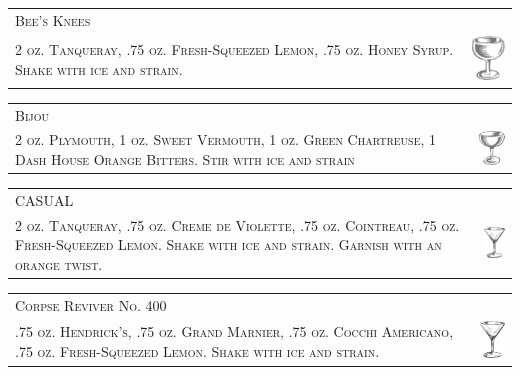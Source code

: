 \documentclass{article}
\begin{document}
\begin{tabular}{b{2.5in} m{0.625in}}
  \multicolumn{2}{p{3.0in}}{\centering\Huge\textsc{Bee's Knees}} \\ 
  \textsc{2 oz. Tanqueray, .75 oz. Fresh-Squeezed Lemon,
  .75 oz. Honey Syrup. Shake with ice and strain.} &
  \includegraphics[width=0.5in]{coupe.png}
\end{tabular}

\begin{tabular}{b{2.5in} m{0.625in}}
  \multicolumn{2}{p{3.0in}}{\centering\Huge\textsc{Bijou}} \\ 
  \textsc{2 oz. Plymouth, 1 oz. Sweet Vermouth, 1 oz. Green Chartreuse, 
  1 Dash House Orange Bitters. Stir with ice and strain} &
  \includegraphics[width=0.5in]{egg_coupe.png}
\end{tabular}

\begin{tabular}{b{2.5in} m{0.625in}}
  \multicolumn{2}{p{3.0in}}{\centering\Huge\textsc{CASUAL}} \\ 
  \textsc{2 oz. Tanqueray, .75 oz. Creme de Violette, .75 oz. Cointreau,
  .75 oz. Fresh-Squeezed Lemon. Shake with ice and strain.
  Garnish with an orange twist.} &
  \includegraphics[width=0.5in]{goblet.png}
\end{tabular}

\begin{tabular}{b{2.5in} m{0.625in}}
  \multicolumn{2}{p{3.0in}}{\centering\Huge\textsc{Corpse Reviver No. 400}} \\ 
  \textsc{.75 oz. Hendrick's, .75 oz. Grand Marnier, .75 oz. Cocchi Americano,
  .75 oz. Fresh-Squeezed Lemon. Shake with ice and strain.} &
  \includegraphics[width=0.5in]{goblet.png}
\end{tabular}
\end{document}
